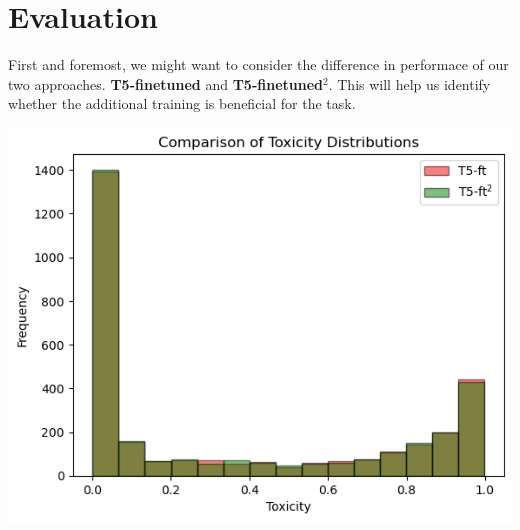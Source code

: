 \section{Evaluation}
First and foremost, we might want to consider the difference in performace of
our two approaches. \textbf{T5-finetuned} and \textbf{T5-finetuned\(^2\)}. This
will help us identify whether the additional training is beneficial for the
task.

\begin{minipage}{\linewidth}
    \includegraphics[scale=0.35]{figures/final/t5-52-toxicity.png}%
    \label{fig:eval:toxdistrt52}%
\end{minipage}

